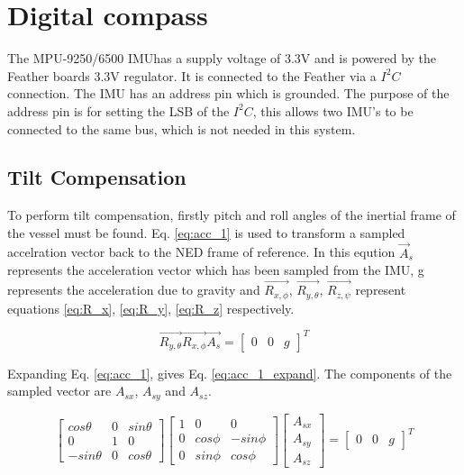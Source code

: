 \section{Digital compass}
The MPU-9250/6500 IMUhas a supply voltage of 3.3V and is powered by the Feather boards 3.3V regulator. It is connected to the Feather via a $I^{2}C$ connection. The IMU has an address pin 
which is grounded. The purpose of the address pin is for setting the LSB of the $I^{2}C$, this allows two IMU's to be connected to the same bus, which is not needed in this system. 

\subsection{Tilt Compensation}
To perform tilt compensation, firstly pitch and roll angles of the inertial frame of the vessel must be found. Eq. \ref{eq:acc_1} is used to transform a sampled accelration vector back to 
the NED frame of reference. In this eqution $\vec{A}_s$ represents the acceleration vector which has been 
sampled from the IMU, g represents the acceleration due to gravity and $\vec{R_{x,\phi}}$, $\vec{R_{y,\theta}}$, $\vec{R_{z,\psi}}$ represent equations \ref{eq:R_x}, \ref{eq:R_y}, \ref{eq:R_z} 
respectively. 

\begin{equation}
    \label{eq:acc_1}
    \vec{R_{y,\theta}}\vec{R_{x,\phi}}\vec{A_s} = \begin{bmatrix} 0 & 0 & g \end{bmatrix}^T
\end{equation}

Expanding Eq. \ref{eq:acc_1}, gives Eq. \ref{eq:acc_1_expand}. The components of the sampled vector are $A_{sx}$, $A_{sy}$ and $A_{sz}$.

\begin{equation}
    \label{eq:acc_1}
    \begin{bmatrix} cos\theta & 0 & sin\theta \\ 0 & 1 & 0 \\ -sin\theta & 0 & cos\theta \end{bmatrix} \begin{bmatrix} 1 & 0 & 0 \\ 0 & cos\phi & -sin\phi \\ 0 & sin\phi & cos\phi \end{bmatrix} \begin{bmatrix} A_{sx} \\ A_{sy} \\ A_{sz} \end{bmatrix}= \begin{bmatrix} 0 & 0 & g \end{bmatrix}^T
\end{equation}



